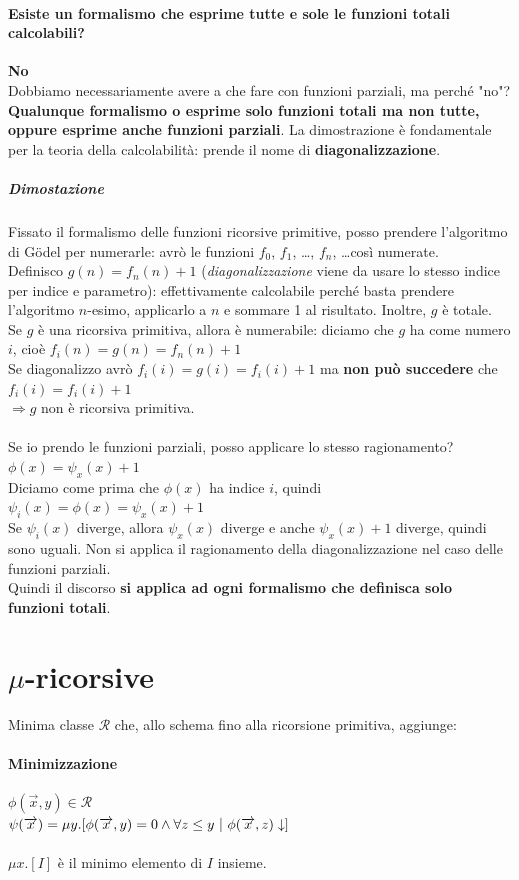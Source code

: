 \documentclass[10pt]{book}
\begin{document}
\paragraph{Esiste un formalismo che esprime tutte e sole le funzioni totali calcolabili?} \textbf{No}\\
Dobbiamo necessariamente avere a che fare con funzioni parziali, ma perché "no"?\\
\textbf{Qualunque formalismo o esprime solo funzioni totali ma non tutte, oppure esprime anche funzioni parziali}. La dimostrazione è fondamentale per la teoria della calcolabilità: prende il nome di \textbf{diagonalizzazione}.
\subparagraph{Dimostazione} Fissato il formalismo delle funzioni ricorsive primitive, posso prendere l'algoritmo di G\"{o}del per numerarle: avrò le funzioni $f_0$, $f_1$, \ldots, $f_n$, \ldots così numerate.\\
Definisco $g(n) = f_n(n) + 1$ (\textit{diagonalizzazione} viene da usare lo stesso indice per indice e parametro): effettivamente calcolabile perché basta prendere l'algoritmo $n$-esimo, applicarlo a $n$ e sommare 1 al risultato. Inoltre, $g$ è totale.\\
Se $g$ è una ricorsiva primitiva, allora è numerabile: diciamo che $g$ ha come numero $i$, cioè $f_i(n) = g(n) = f_n(n) + 1$\\
Se diagonalizzo avrò $f_i(i) = g(i) = f_i(i) + 1$ ma \textbf{non può succedere} che $f_i(i) = f_i(i) + 1$\\
$\Rightarrow g$ non è ricorsiva primitiva.\\\\
Se io prendo le funzioni parziali, posso applicare lo stesso ragionamento?\\
$\phi(x) = \psi_x(x) + 1$\\
Diciamo come prima che $\phi(x)$ ha indice $i$, quindi $\psi_i(x) = \phi(x) = \psi_x(x) + 1$\\
Se $\psi_i(x)$ diverge, allora $\psi_x(x)$ diverge e anche $\psi_x(x) + 1$ diverge, quindi sono uguali. Non si applica il ragionamento della diagonalizzazione nel caso delle funzioni parziali.\\
Quindi il discorso \textbf{si applica ad ogni formalismo che definisca solo funzioni totali}.
\section{$\mu$-ricorsive}
Minima classe $\mathscr{R}$ che, allo schema fino alla ricorsione primitiva, aggiunge:
\paragraph{Minimizzazione} $\phi(\overrightarrow{x}, y) \in \mathscr{R}$\\
$\psi(\overrightarrow{x}) = \mu y.[\phi(\overrightarrow{x}, y) = 0 \wedge \forall z \leq y\:\:\vline\:\: \phi(\overrightarrow{x}, z)\downarrow] $\\\\
$\mu x.[I]$ è il minimo elemento di $I$ insieme.
\pagebreak
\end{document}
